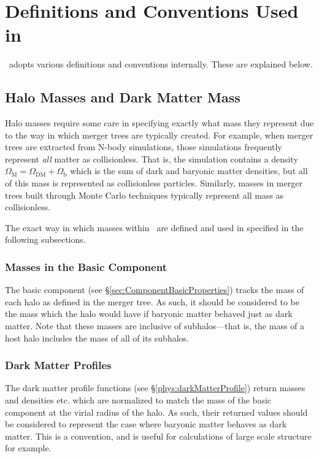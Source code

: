 \chapter{Definitions and Conventions Used in \glc}

\glc\ adopts various definitions and conventions internally. These are explained below.

\section{Halo Masses and Dark Matter Mass}

Halo masses require some care in specifying exactly what mass they represent due to the way in which merger trees are typically created. For example, when merger trees are extracted from N-body simulations, those simulations frequently represent \emph{all} matter as collisionless. That is, the simulation contains a density $\Omega_\mathrm{M}=\Omega_\mathrm{DM}+\Omega_\mathrm{b}$ which is the sum of dark and baryonic matter densities, but all of this mass is represented as collisionless particles. Similarly, masses in merger trees built through Monte Carlo techniques typically represent all mass as collisionless.

The exact way in which masses within \glc\ are defined and used in specified in the following subsections.

\subsection{Masses in the Basic Component}

The {\normalfont \ttfamily basic} component (see \S\ref{sec:ComponentBasicProperties}) tracks the mass of each halo as defined in the merger tree. As such, it should be considered to be the mass which the halo would have if baryonic matter behaved just as dark matter. Note that these masses are inclusive of subhalos---that is, the mass of a host halo includes the mass of all of its subhalos.

\subsection{Dark Matter Profiles}

The dark matter profile functions (see \S\ref{phys:darkMatterProfile}) return masses and densities etc. which are normalized to match the mass of the {\normalfont \ttfamily basic} component at the virial radius of the halo. As such, their returned values should be considered to represent the case where baryonic matter behaves as dark matter. This is a convention, and is useful for calculations of large scale structure for example.

